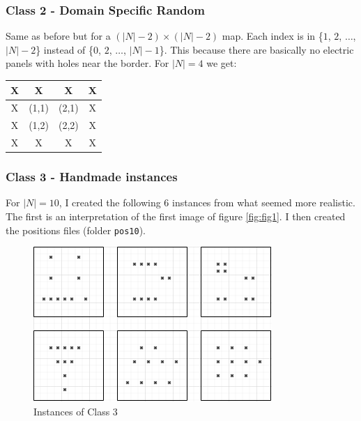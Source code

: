 \documentclass[a4paper,12pt]{article}
\begin{document}
			
			\subsubsection{Class 2 - Domain Specific Random}
				Same as before but for a $ (|N|-2) \times (|N|-2)  $ map.
				Each index is in \{$ 1 $, $ 2 $, $\ldots$, $ |N|-2 $\} instead of \{$ 0 $, $ 2 $, $\ldots$, $ |N|-1 $\}.
				This because there are basically no electric panels with holes near the border.
				For $ |N| = 4 $ we get:

			\begin{table}[H]
				\centering
				\begin{tabular}{|c|c|c|c|}
					\hline
					X &   X   &   X   & X  \\ \hline
					X & (1,1) & (2,1) & X \\ \hline
					X & (1,2) & (2,2) & X \\ \hline
					X &   X   &   X   & X  \\ \hline
				\end{tabular}
			\end{table}
				
	\pagebreak
				
			\subsubsection{Class 3 - Handmade instances}
				For $ |N| = 10 $, I created the following 6 instances from what seemed more realistic.
				The first is an interpretation of the first image of figure \ref{fig:fig1}.
				I then created the positions files (folder \texttt{pos10}).
				
					\begin{figure}[H]
						\centering
						\includegraphics[width=.7\linewidth]{class3.png}  
						\caption{Instances of Class 3}
						\label{fig:figsClass3}
					\end{figure}
				
\end{document}

